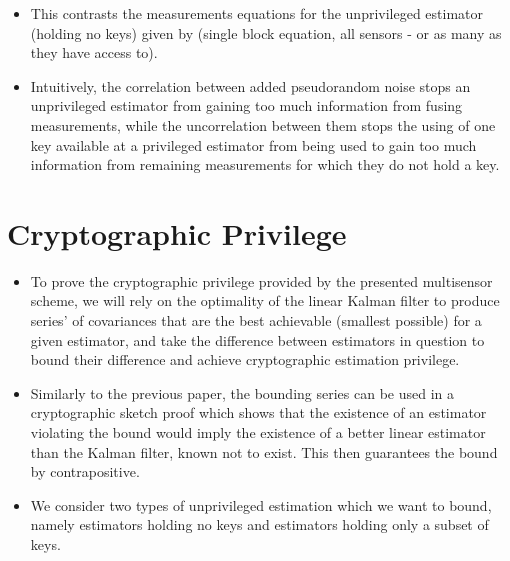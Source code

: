 \documentclass[conference]{IEEEtran}
\begin{document}
\begin{itemize}
  \item This contrasts the measurements equations for the unprivileged estimator (holding no keys) given by (single block equation, all sensors - or as many as they have access to).
  \item Intuitively, the correlation between added pseudorandom noise stops an unprivileged estimator from gaining too much information from fusing measurements, while the uncorrelation between them stops the using of one key available at a privileged estimator from being used to gain too much information from remaining measurements for which they do not hold a key.
\end{itemize}


\section{Cryptographic Privilege}
\begin{itemize}
  \item To prove the cryptographic privilege provided by the presented multisensor scheme, we will rely on the optimality of the linear Kalman filter to produce series' of covariances that are the best achievable (smallest possible) for a given estimator, and take the difference between estimators in question to bound their difference and achieve cryptographic estimation privilege.
  \item Similarly to the previous paper, the bounding series can be used in a cryptographic sketch proof which shows that the existence of an estimator violating the bound would imply the existence of a better linear estimator than the Kalman filter, known not to exist. This then guarantees the bound by contrapositive.
  \item We consider two types of unprivileged estimation which we want to bound, namely estimators holding no keys and estimators holding only a subset of keys.
\end{itemize}
\end{document}
